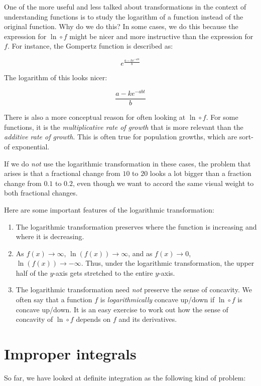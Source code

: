 \documentclass[10pt]{amsart}
\begin{document}
One of the more useful and less talked about transformations in the
context of understanding functions is to study the logarithm of a
function instead of the original function. Why do we do this? In some
cases, we do this because the expression for $\ln \circ f$ might be
nicer and more instructive than the expression for $f$. For instance,
the Gompertz function is described as:

$$e^{\frac{a - ke^{-abt}}{b}}$$

The logarithm of this looks nicer:

$$\frac{a - ke^{-abt}}{b}$$

There is also a more conceptual reason for often looking at $\ln \circ
f$. For some functions, it is the {\em multiplicative rate of growth}
that is more relevant than the {\em additive rate of growth}. This is
often true for population growths, which are sort-of exponential.

If we do {\em not} use the logarithmic transformation in these cases,
the problem that arises is that a fractional change from $10$ to $20$
looks a lot bigger than a fraction change from $0.1$ to $0.2$, even
though we want to accord the same visual weight to both fractional
changes.

Here are some important features of the logarithmic transformation:

\begin{enumerate}
\item The logarithmic transformation preserves where the function is
  increasing and where it is decreasing. 
\item As $f(x) \to \infty$, $\ln(f(x)) \to \infty$, and as $f(x) \to
  0$, $\ln(f(x)) \to -\infty$. Thus, under the logarithmic
  transformation, the upper half of the $y$-axis gets stretched to the
  entire $y$-axis.
\item The logarithmic transformation need {\em not} preserve the sense
  of concavity. We often say that a function $f$ is {\em
  logarithmically} concave up/down if $\ln \circ f$ is concave
  up/down. It is an easy exercise to work out how the sense of
  concavity of $\ln \circ f$ depends on $f$ and its derivatives.
\end{enumerate}

\section{Improper integrals}

So far, we have looked at definite integration as the following kind
of problem:
\end{document}
